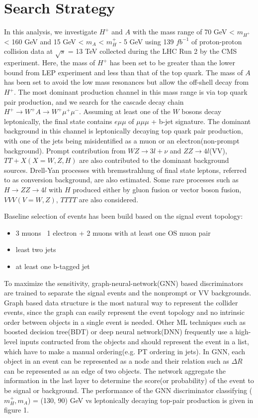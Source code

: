 \documentclass[
12pt, %
a4paper, %
oneside, %
headinclude,footinclude, %
BCOR5mm, %
]{scrartcl}
\begin{document}
\section{Search Strategy}
In this analysis, we investigate $H^+$ and $A$ with the mass range of
70 GeV < $m_{H^+}$ < 160 GeV and 15 GeV < $m_A$ < $m_H^+$ - 5 GeV using 139 $fb^{-1}$
of proton-proton collision data at $\sqrt{s}$ = 13 TeV collected during the LHC Run 2
by the CMS experiment. Here, the mass of $H^+$ has been set to be greater than the lower bound
from LEP experiment and less than that of the top quark. The mass of $A$ has been set to avoid
the low mass resonances but allow the off-shell decay from $H^+$. The most dominant
production channel in this mass range is via top quark pair production, and we search for the 
cascade decay chain $H^+ \rightarrow W^+A \rightarrow W^+\mu^+\mu^-$. Assuming at least one
of the $W$ bosons decay leptonically, the final state contains $e\mu\mu$ of $\mu\mu\mu$ + b-jet
signature. The dominant background in this channel is leptonically decaying top quark pair production,
with one of the jets being misidentified as a muon or an electron(non-prompt background).
Prompt contribution from $WZ \rightarrow 3l + \nu$ and $ZZ \rightarrow 4l$(VV), $TT + X(X=W, Z, H)$
are also contributed to the dominant background sources. Drell-Yan processes with bremsstrahlung
of final state leptons, referred to as conversion background, are also estimated. Some rare processes
such as $H \rightarrow ZZ \rightarrow 4l$ with $H$ produced either by gluon fusion or vector boson fusion,
$VVV (V=W, Z)$, $TTTT$ are also considered.

Baseline selection of events has been build based on the signal event topology:
\begin{itemize}
    \item 3 muons \ 1 electron + 2 muons with at least one OS muon pair
    \item least two jets
    \item at least one b-tagged jet
\end{itemize}

To maximize the sensitivity, graph-neural-network(GNN) based discriminators are trained
to separate the signal events and the nonprompt or VV backgrounds. Graph based data structure
is the most natural way to represent the collider events, since the graph can easily represent
the event topology and no intrinsic order between objects in a single event is needed. Other ML
techniques such as boosted decision tree(BDT) or deep neural network(DNN) frequently use a high-level
inputs contructed from the objects and should represent the event
in a list, which have to make  a manual ordering(e.g. PT ordering in jets).
In GNN, each object in an event can be represented as a node and their relation such as $\Delta R$
can be represented as an edge of two objects. The network aggregate the information in the last layer
to determine the score(or probability) of the event to be signal or background. The performance of the
GNN discriminator classifying ($m_H^{+}, m_A$) = (130, 90) GeV vs leptonically decaying top-pair production
is given in figure 1. 
\end{document}
